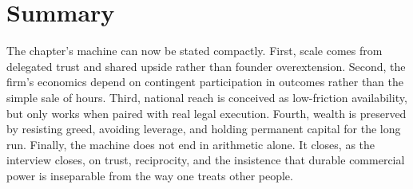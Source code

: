 \section{Summary}

The chapter's machine can now be stated compactly. First, scale comes from delegated trust and shared upside rather than founder overextension. Second, the firm's economics depend on contingent participation in outcomes rather than the simple sale of hours. Third, national reach is conceived as low-friction availability, but only works when paired with real legal execution. Fourth, wealth is preserved by resisting greed, avoiding leverage, and holding permanent capital for the long run. Finally, the machine does not end in arithmetic alone. It closes, as the interview closes, on trust, reciprocity, and the insistence that durable commercial power is inseparable from the way one treats other people.